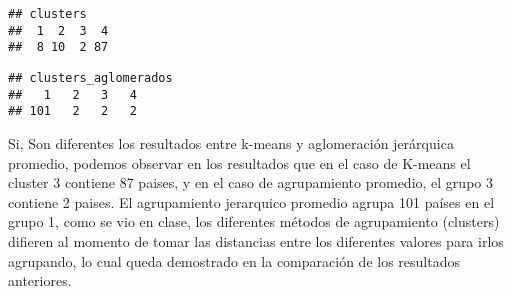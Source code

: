 \documentclass[
]{article}
\newenvironment{Shaded}{\begin{snugshade}}{\end{snugshade}}
\newcommand{\AttributeTok}[1]{\textcolor[rgb]{0.13,0.29,0.53}{#1}}
\newcommand{\CommentTok}[1]{\textcolor[rgb]{0.56,0.35,0.01}{\textit{#1}}}
\newcommand{\DecValTok}[1]{\textcolor[rgb]{0.00,0.00,0.81}{#1}}
\newcommand{\FunctionTok}[1]{\textcolor[rgb]{0.13,0.29,0.53}{\textbf{#1}}}
\newcommand{\NormalTok}[1]{#1}
\newcommand{\OtherTok}[1]{\textcolor[rgb]{0.56,0.35,0.01}{#1}}
\newcommand{\SpecialCharTok}[1]{\textcolor[rgb]{0.81,0.36,0.00}{\textbf{#1}}}
\newcommand{\StringTok}[1]{\textcolor[rgb]{0.31,0.60,0.02}{#1}}
\begin{document}
\begin{Shaded}
\end{Shaded}

\begin{verbatim}
## clusters
##  1  2  3  4 
##  8 10  2 87
\end{verbatim}

\begin{Shaded}
\end{Shaded}

\begin{verbatim}
## clusters_aglomerados
##   1   2   3   4 
## 101   2   2   2
\end{verbatim}

Si, Son diferentes los resultados entre k-means y aglomeración
jerárquica promedio, podemos observar en los resultados que en el caso
de K-means el cluster 3 contiene 87 paises, y en el caso de agrupamiento
promedio, el grupo 3 contiene 2 paises. El agrupamiento jerarquico
promedio agrupa 101 países en el grupo 1, como se vio en clase, los
diferentes métodos de agrupamiento (clusters) difieren al momento de
tomar las distancias entre los diferentes valores para irlos agrupando,
lo cual queda demostrado en la comparación de los resultados anteriores.
\end{document}
